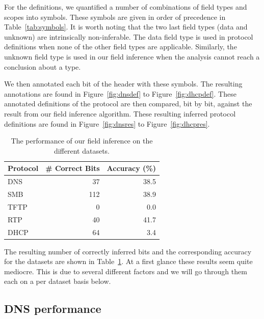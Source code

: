 \documentclass[a4paper]{report}
\begin{document}
For the definitions, we quantified a number of combinations of field types and
scopes into symbols. These symbols are given in order of precedence in
Table~\ref{tab:symbols}. It is worth noting that the two last field types (data
and unknown) are intrinsically non-inferable. The data field type is used in
protocol definitions when none of the other field types are applicable.
Similarly, the unknown field type is used in our field inference when the
analysis cannot reach a conclusion about a type.

We then annotated each bit of the header with these symbols. The resulting
annotations are found in Figure~\ref{fig:dnsdef} to Figure~\ref{fig:dhcpdef}.
These annotated definitions of the protocol are then compared, bit by bit,
against the result from our field inference algorithm. These resulting inferred
protocol definitions are found in Figure~\ref{fig:dnsres} to
Figure~\ref{fig:dhcpres}.

\begin{table}[h]
    \centering
    \captionsetup{width=0.8\textwidth}
    \caption{The performance of our field inference on the different datasets.}
    \begin{tabular}{| l | r | r |}
        \hline
        \textbf{Protocol}&\textbf{\# Correct Bits}&\textbf{Accuracy (\%)} \\ \hline
        DNS & 37 & 38.5 \\ \hline
        SMB & 112 & 38.9 \\ \hline
        TFTP & 0 & 0.0 \\ \hline
        RTP & 40 & 41.7 \\ \hline
        DHCP & 64 & 3.4 \\ \hline
    \end{tabular}
    \label{tab:accuracy}
\end{table}

The resulting number of correctly inferred bits and the corresponding accuracy
for the datasets are shown in Table~\ref{tab:accuracy}. At a first glance these
results seem quite mediocre. This is due to several different factors and we
will go through them each on a per dataset basis below.

\subsection{DNS performance}
\end{document}
